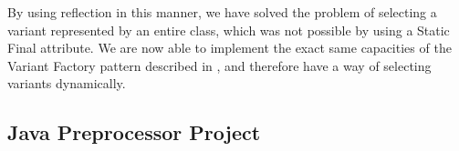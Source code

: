 By using reflection in this manner, we have solved the problem of selecting a \gls{variant} represented by an entire class, which was not possible by using a Static Final attribute. We are now able to implement the exact same capacities of the Variant Factory pattern described in \cite{LASER:2015}, and therefore have a way of selecting \gls{variant}s dynamically.


\subsection{Java Preprocessor Project}
\label{sc:prepros}


